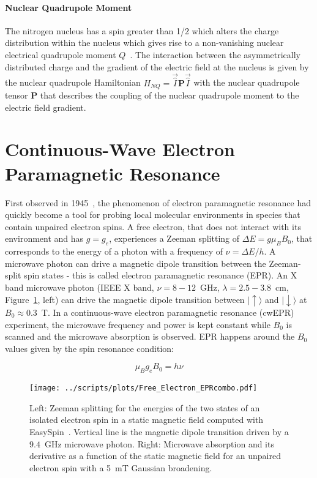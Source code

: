 \paragraph*{Nuclear Quadrupole Moment}
The nitrogen nucleus has a spin greater than 1/2 which alters the charge distribution within the nucleus which gives rise to a non-vanishing nuclear electrical quadrupole moment $Q$~\cite{Schweiger2001}. The interaction between the asymmetrically distributed charge and the gradient of the electric field at the nucleus is given by the nuclear quadrupole Hamiltonian $H_{NQ}=\vec{\hat{I}}\textbf{P}\vec{\hat{I}}$ with the nuclear quadrupole tensor $\textbf{P}$ that describes the coupling of the nuclear quadrupole moment to the electric field gradient.




\section{Continuous-Wave Electron Paramagnetic Resonance}
\label{subs:cwEPR_spectroscopy}
First observed in 1945~\cite{Zavoisky_1945_JP,zavoisky_1945,salikhov_2015}, the phenomenon of electron paramagnetic resonance had quickly become a tool for probing local molecular environments in species that contain unpaired electron spins. A free electron, that does not interact with its environment and has $g=g_e$, experiences a Zeeman splitting of $\Delta E = g \mu_B B_0$, that corresponds to the energy of a photon with a frequency of $\nu=\Delta E / h$. A microwave photon can drive a magnetic dipole transition between the Zeeman-split spin states - this is called electron paramagnetic resonance (EPR). An X band microwave photon (IEEE X band, $\nu=8-12$~GHz, $\lambda=2.5-3.8$~cm, Figure~\ref{fig:cwerp_free_electron}, left) can drive the magnetic dipole transition between $\vert{\uparrow\rangle}$ and $\vert{\downarrow\rangle}$ at $B_0\approx0.3$~T. In a continuous-wave electron paramagnetic resonance (cwEPR) experiment, the microwave frequency and power is kept constant while $B_0$ is scanned and the microwave absorption is observed. EPR happens around the $B_0$ values given by the spin resonance condition:

\begin{equation}
\label{eq:epr_resonance_condition}
\mu_B g_e B_0 = h\nu
\end{equation}

\begin{figure}[h]
\center
	\texttt{[image: ../scripts/plots/Free\_Electron\_EPRcombo.pdf]}
	\caption{Left: Zeeman splitting for the energies of the two states of an isolated electron spin in a static magnetic field computed with EasySpin~\cite{Stoll2006}. Vertical line is the magnetic dipole transition driven by a $9.4$~GHz microwave photon. Right: Microwave absorption and its derivative as a function of the static magnetic field for an unpaired electron spin with a 5~mT Gaussian broadening.}
	\label{fig:cwerp_free_electron}
\end{figure}


